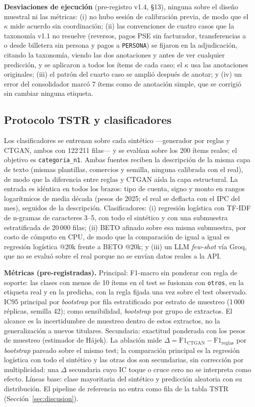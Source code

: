 \documentclass[journal]{IEEEtai}
\begin{document}
\textbf{Desviaciones de ejecución} (pre-registro v1.4, §13), ninguna sobre el diseño muestral ni las métricas: (i) no hubo sesión de calibración previa, de modo que el $\kappa$ mide acuerdo sin coordinación; (ii) las convenciones de cuatro casos que la taxonomía v1.1 no resuelve (reversos, pagos PSE sin facturador, transferencias a o desde billetera sin persona y pagos a \texttt{PERSONA}) se fijaron en la adjudicación, citando la taxonomía, viendo las dos anotaciones y antes de ver cualquier predicción, y se aplicaron a todos los ítems de cada caso; el $\kappa$ usa las anotaciones originales; (iii) el patrón del cuarto caso se amplió después de anotar; y (iv) un error del consolidador marcó 7 ítems como de anotación simple, que se corrigió sin cambiar ninguna etiqueta.

\subsection{Protocolo TSTR y clasificadores}
\label{sec:tstr}
Los clasificadores se entrenan sobre cada sintético —generador por reglas y CTGAN, ambos con 122\,211 filas— y se evalúan sobre los 200 ítems reales; el objetivo es \texttt{categoria\_n1}. Ambas fuentes reciben la descripción de la misma capa de texto (mismas plantillas, comercios y semilla, ninguna calibrada con el real), de modo que la diferencia entre reglas y CTGAN aísla la capa estructural. La entrada es idéntica en todos los brazos: tipo de cuenta, signo y monto en rangos logarítmicos de media década (pesos de 2025; el real se deflacta con el IPC del mes), seguidos de la descripción. Clasificadores: (i) regresión logística con TF-IDF de n-gramas de caracteres 3--5, con todo el sintético y con una submuestra estratificada de 20\,000 filas; (ii) BETO afinado sobre esa misma submuestra, por costo de cómputo en CPU, de modo que la comparación de igual a igual es regresión logística @20k frente a BETO @20k; y (iii) un LLM \textit{few-shot} vía Groq, que no se evaluó sobre el real porque no se envían datos reales a la API.

\textbf{Métricas (pre-registradas).} Principal: F1-macro sin ponderar con regla de soporte: las clases con menos de 10 ítems en el test se fusionan con \texttt{otros}, en la etiqueta real y en la predicha, con la regla fijada una vez sobre el test observado. IC95 principal por \textit{bootstrap} por fila estratificado por estrato de muestreo (1\,000 réplicas, semilla 42); como sensibilidad, \textit{bootstrap} por grupo de extractos. El alcance es la incertidumbre de muestreo dentro de estos extractos, no la generalización a nuevos titulares. Secundaria: exactitud ponderada con los pesos de muestreo (estimador de Hájek). La ablación mide $\Delta=\mathrm{F1}_{\mathrm{CTGAN}}-\mathrm{F1}_{\mathrm{reglas}}$ por \textit{bootstrap} pareado sobre el mismo test; la comparación principal es la regresión logística con todo el sintético y las otras dos son secundarias, sin corrección por multiplicidad: una $\Delta$ secundaria cuyo IC toque o cruce cero no se interpreta como efecto. Líneas base: clase mayoritaria del sintético y predicción aleatoria con su distribución. El pipeline de referencia no entra como fila de la tabla TSTR (Sección~\ref{sec:discusion}).
\end{document}
